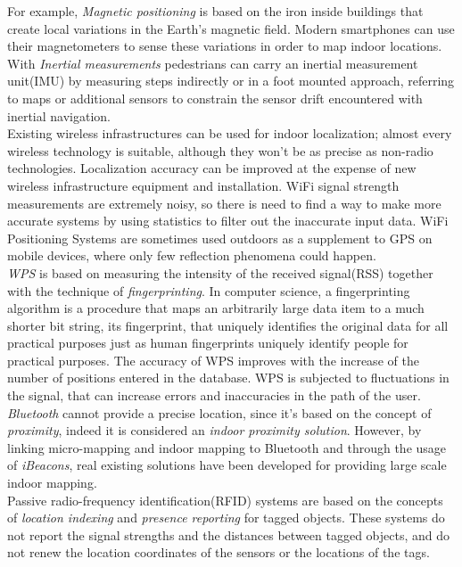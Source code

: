 For example, \textit{Magnetic positioning} is based on the iron inside buildings that create local variations in the Earth’s magnetic field.
Modern smartphones can use their magnetometers to sense these variations in order to map indoor locations.
\\

With \textit{Inertial measurements} pedestrians can carry an inertial measurement unit(IMU) by measuring steps indirectly or in a foot mounted approach, referring to maps or additional sensors to constrain the sensor drift encountered with inertial navigation.
\\

Existing wireless infrastructures can be used for indoor localization; almost every wireless technology is suitable, although they won't be as precise as non-radio technologies.
Localization accuracy can be improved at the expense of new wireless infrastructure equipment and installation.
WiFi signal strength measurements are extremely noisy, so there is need to find a way to make more accurate systems by using statistics to filter out the inaccurate input data. WiFi Positioning Systems are sometimes used outdoors as a supplement to GPS on mobile devices, where only few reflection phenomena could happen.
\\

\textit{WPS} is based on measuring the intensity of the received signal(RSS) together with the technique of \textit{fingerprinting}.
In computer science, a fingerprinting algorithm is a procedure that maps an arbitrarily large data item to a much shorter bit string, its fingerprint, that uniquely identifies the original data for all practical purposes just as human fingerprints uniquely identify people for practical purposes.
The accuracy of WPS improves with the increase of the number of positions entered in the database.
WPS is subjected to fluctuations in the signal, that can increase errors and inaccuracies in the path of the user.
\\

\textit{Bluetooth} cannot provide a precise location, since it's based on the concept of \textit{proximity}, indeed it is considered an \textit{indoor proximity solution}.
However, by linking micro-mapping and indoor mapping to Bluetooth and through the usage of \textit{iBeacons}, real existing solutions have been developed for providing large scale indoor mapping.
\\

Passive radio-frequency identification(RFID) systems are based on the concepts of \textit{location indexing} and \textit{presence reporting} for tagged objects.
These systems do not report the signal strengths and the distances between tagged objects, and do not renew the location coordinates of the sensors or the locations of the tags.
\\

